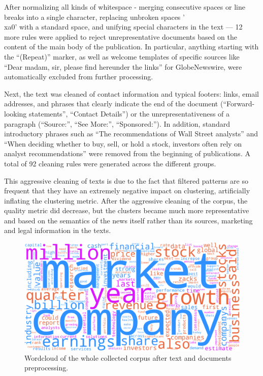 After normalizing all kinds of whitespace - merging consecutive spaces or line breaks into a single character, replacing unbroken
spaces '\\xa0' with a standard space, and unifying special characters in the text — 12 more rules were applied to reject
unrepresentative documents based on the content of the main body of the publication. In particular, anything starting with
the “(Repeat)” marker, as well as welcome templates of specific sources like “Dear madam, sir, please find hereunder the links”
for GlobeNewswire, were automatically excluded from further processing.

Next, the text was cleaned of contact information and typical footers: links, email addresses, and phrases that clearly indicate
the end of the document (“Forward-looking statements”, “Contact Details”) or the unrepresentativeness of a paragraph (“Source:”,
“See More:”, “Sponsored:”). In addition, standard introductory phrases such as “The recommendations of Wall Street analysts” and
“When deciding whether to buy, sell, or hold a stock, investors often rely on analyst recommendations” were removed from
the beginning of publications. A total of 92 cleaning rules were generated across the different groups.

This aggressive cleaning of texts is due to the fact that filtered patterns are so frequent that they have an extremely negative
impact on clustering, artificially inflating the clustering metric. After the aggressive cleaning of the corpus, the quality metric
did decrease, but the clusters became much more representative and based on the semantics of the news itself rather than its
sources, marketing and legal information in the texts.

\begin{figure}[H]
    \centering
    \includegraphics[width=1\linewidth]{img/prep_wordcloud.png}
    \caption{\label{fig:prep_wordcloud} Wordcloud of the whole collected corpus after text and documents preprocessing.}
\end{figure}


